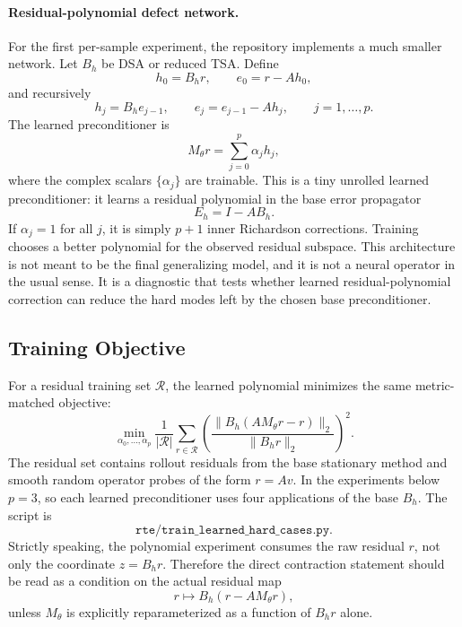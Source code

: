 \documentclass[11pt]{article}
\begin{document}
\paragraph{Residual-polynomial defect network.}
For the first per-sample experiment, the repository implements a much smaller
network.  Let \(B_h\) be DSA or reduced TSA.  Define
\[
  h_0=B_h r,\qquad e_0=r-Ah_0,
\]
and recursively
\[
  h_j=B_h e_{j-1},\qquad e_j=e_{j-1}-Ah_j,
  \qquad j=1,\ldots,p.
\]
The learned preconditioner is
\[
  M_\theta r=\sum_{j=0}^{p}\alpha_j h_j ,
\]
where the complex scalars \(\{\alpha_j\}\) are trainable.  This is a tiny
unrolled learned preconditioner: it learns a residual polynomial in the base
error propagator
\[
  E_h=I-AB_h.
\]
If \(\alpha_j=1\) for all \(j\), it is simply \(p+1\) inner Richardson
corrections.  Training chooses a better polynomial for the observed residual
subspace.  This architecture is not meant to be the final generalizing model,
and it is not a neural operator in the usual sense. It is a diagnostic that
tests whether learned residual-polynomial correction can reduce the hard modes
left by the chosen base preconditioner.

\subsection{Training Objective}

For a residual training set \(\mathcal R\), the learned polynomial minimizes
the same metric-matched objective:
\[
  \min_{\alpha_0,\ldots,\alpha_p}
  \frac{1}{|\mathcal R|}
  \sum_{r\in\mathcal R}
  \left(
  \frac{\|B_h(A M_\theta r-r)\|_2}{\|B_h r\|_2}
  \right)^2 .
\]
The residual set contains rollout residuals from the base stationary method
and smooth random operator probes of the form \(r=A v\).  In the experiments
below \(p=3\), so each learned preconditioner uses four applications of the
base \(B_h\).  The script is
\[
  \texttt{rte/train\_learned\_hard\_cases.py}.
\]
Strictly speaking, the polynomial experiment consumes the raw residual \(r\),
not only the coordinate \(z=B_hr\).  Therefore the direct contraction statement
should be read as a condition on the actual residual map
\[
  r\mapsto B_h(r-AM_\theta r),
\]
unless \(M_\theta\) is explicitly reparameterized as a function of \(B_hr\)
alone.
\end{document}
